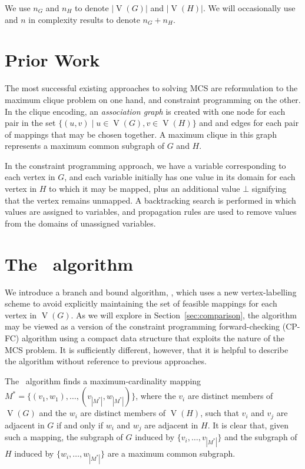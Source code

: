 \documentclass[letterpaper]{article}
\newcommand{\McSplit}{\textproc{McSplit}}
\DeclareMathOperator{\V}{V}
\begin{document}
We use $n_G$ and $n_H$ to denote $|\V(G)|$ and $|\V(H)|$. We will occasionally use
and $n$ in complexity results to denote $n_G + n_H$.

\section{Prior Work}

The most successful existing approaches to solving MCS are reformulation to the
maximum clique problem on one hand, and constraint programming
\cite{DBLP:conf/cp/McCreeshNPS16} on the other. In the clique encoding, an
\textit{association graph} is created with one node for each pair in the set
$\{(u,v) \mid u \in \V(G), v \in \V(H) \}$ and and edges for each pair of
mappings that may be chosen together. A maximum clique in this graph represents
a maximum common subgraph of $G$ and $H$.

In the constraint programming approach, we have a variable corresponding to
each vertex in $G$, and each variable initially has one value in its domain for
each vertex in $H$ to which it may be mapped, plus an additional value $\bot$
signifying that the vertex remains unmapped. A backtracking search is performed
in which values are assigned to variables, and propagation rules are used to
remove values from the domains of unassigned variables.

\section{The \McSplit\ algorithm}

We introduce a branch and bound algorithm, \McSplit, which uses a new
vertex-labelling scheme to avoid explicitly maintaining the set of feasible
mappings for each vertex in $\V(G)$. As we will explore in
Section~\ref{sec:comparison}, the algorithm may be viewed as a version of the
constraint programming forward-checking (CP-FC) algorithm using a compact data
structure that exploits the nature of the MCS problem.  It is sufficiently
different, however, that it is helpful to describe the algorithm without
reference to previous approaches.


The \McSplit\ algorithm finds a maximum-cardinality mapping $M^* = \{(v_1, w_1), \dots,
(v_{|M^*|}, w_{|M^*|})\}$, where the $v_i$ are distinct members of $\V(G)$ and the
$w_i$ are distinct members of $\V(H)$, such that $v_i$ and $v_j$ are adjacent
in $G$ if and only if $w_i$ and $w_j$ are adjacent in $H$. It is clear that,
given such a mapping, the subgraph of $G$ induced by $\{v_i, \dots, v_{|M^*|}\}$
and the subgraph of $H$ induced by $\{w_i, \dots, w_{|M^*|}\}$ are a maximum
common subgraph.
\end{document}

